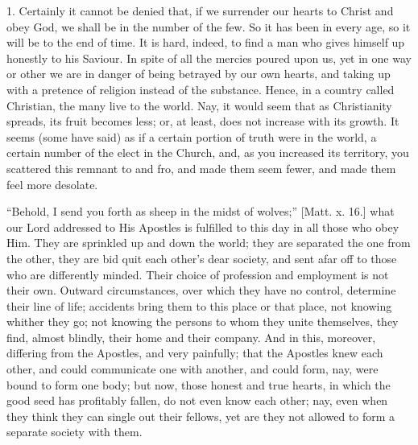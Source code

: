 1. Certainly it cannot be denied that, if we surrender our hearts
to Christ and obey God, we shall be in the number of the few. So it
has been in every age, so it will be to the end of time. It is hard,
indeed, to find a man who gives himself up honestly to his Saviour. In
spite of all the mercies poured upon us, yet in one way or other we
are in danger of being betrayed by our own hearts, and taking up with
a pretence of religion instead of the substance. Hence, in a country
called Christian, the many live to the world. Nay, it would seem that
as Christianity spreads, its fruit becomes less; or, at least, does
not increase with its growth. It seems (some have said) as if a
certain portion of truth were in the world, a certain number of the
elect in the Church, and, as you increased its territory, you
scattered this remnant to and fro, and made them seem fewer, and made
them feel more desolate.

``Behold, I send you forth as sheep in the midst of
wolves;'' [Matt. x. 16.] what our Lord addressed to His Apostles
is fulfilled to this day in all those who obey Him. They are sprinkled
up and down the world; they are separated the one from the other, they
are bid quit each other's dear society, and sent afar off to those
who are differently minded. Their choice of profession and employment
is not their own. Outward circumstances, over which they have no
control, determine their line of life; accidents bring them to this
place or that place, not knowing whither they go; not knowing the
persons to whom they unite themselves, they find, almost blindly,
their home and their company. And in this, moreover, differing from
the Apostles, and very painfully; that the Apostles knew each other,
and could communicate one with another, and could form, nay, were
bound to form one body; but now, those honest and true hearts, in
which the good seed has profitably fallen, do not even know each
other; nay, even when they think they can single out their fellows,
yet are they not allowed to form a separate society with them.

